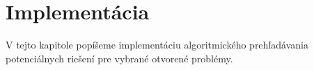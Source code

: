 \chapter{Implementácia}

\label{kap:implementation} %

V tejto kapitole popíšeme implementáciu algoritmického prehľadávania potenciálnych riešení pre vybrané otvorené problémy.


